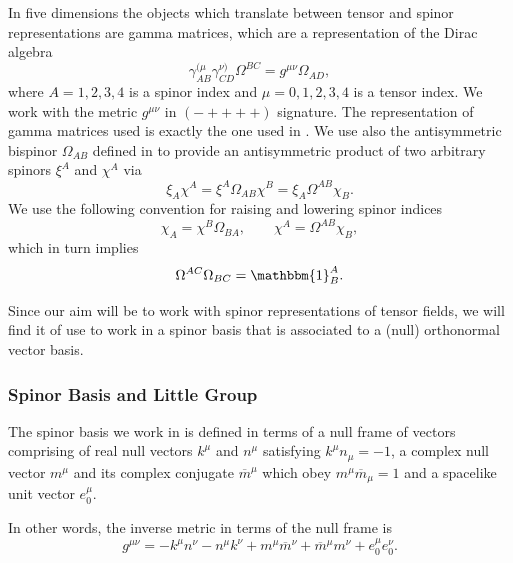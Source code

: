 In five dimensions the objects which translate between tensor and spinor representations are gamma matrices,
which are a representation of the Dirac algebra
\begin{equation} 
    \gamma^{(\mu}_{AB} \gamma^{\nu)}_{CD} \Omega^{BC} = g^{\mu \nu} \Omega_{AD},
\end{equation}
where $A = 1, 2, 3, 4$ is a spinor index and $\mu = 0, 1, 2, 3, 4$ is a tensor index. We work with the metric
$g^{\mu \nu}$ in $(- + + + +)$ signature. The representation of gamma matrices used is exactly the one used in
\cite{Monteiro:2018xev}. We use also the antisymmetric bispinor $\Omega_{AB}$ defined in
\cite{Monteiro:2018xev} to provide an antisymmetric product of two arbitrary spinors $\xi^{A}$ and
$\chi^{A}$ via
\begin{equation} 
    \xi_{A} \chi^{A} = \xi^{A} \Omega_{AB} \chi^{B} = \xi_{A} \Omega^{AB} \chi_{B}.
\end{equation}
We use the following convention for raising and lowering spinor indices
\begin{equation} 
    \chi_{A} = \chi^{B} \Omega_{BA}, \qquad \chi^{A} = \Omega^{AB} \chi_{B},
\end{equation}
which in turn implies
\begin{equation} 
    \Omega^{AC} \Omega_{BC} = \mathbbm{1}^{A}_{B}.
\end{equation}

Since our aim will be to work with spinor representations of tensor fields, we will find it of use to work in a
spinor basis that is associated to a (null) orthonormal vector basis.
\subsubsection{Spinor Basis and Little Group} \label{5D:sec:SpinorBasis5D} 
%
The spinor basis we work in is defined in terms of a null frame of vectors comprising of real null vectors
$k^{\mu}$ and $n^{\mu}$ satisfying $k^{\mu} n_{\mu} = -1$, a complex null vector $m^{\mu}$ and its complex
conjugate $\overline{m}^{\mu}$ which obey $m^{\mu} \overline{m}_{\mu} = 1$ and a spacelike unit vector
$e_{0}^{\mu}$. 

In other words, the inverse metric in terms of the null frame is
\begin{equation} \label{5D:NullFrameMetric} 
    g^{\mu \nu} = -k^{\mu} n^{\nu} - n^{\mu} k^{\nu} + m^{\mu} \overline{m}^{\nu} + \overline{m}^{\mu}
    m^{\nu} + e_{0}^{\mu} e_{0}^{\nu}.
\end{equation}

